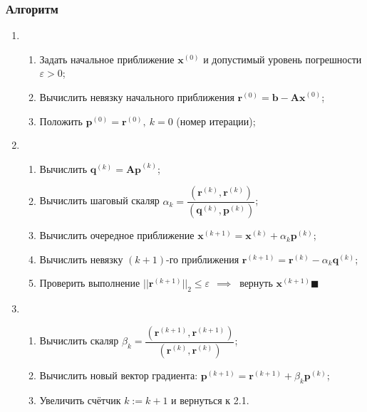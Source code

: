\subsubsection{Алгоритм}
\begin{enumerate}
    \item \begin{enumerate}
        \item Задать начальное приближение $\mathbf{x}^{(0)}$ и допустимый уровень погрешности $\varepsilon>0$;
        \item Вычислить невязку начального приближения $\mathbf{r}^{(0)}=\mathbf{b-Ax}^{(0)}$;
        \item Положить $\mathbf{p}^{(0)}=\mathbf{r}^{(0)},~k=0$ (номер итерации);
    \end{enumerate}
    \item \begin{enumerate}
        \item Вычислить $\mathbf{q}^{(k)}=\mathbf{Ap}^{(k)}$;
        \item Вычислить шаговый скаляр $\alpha_k=\dfrac{(\mathbf{r}^{(k)}, \mathbf{r}^{(k)})}{(\mathbf{q}^{(k)}, \mathbf{p}^{(k)})}$;
        \item Вычислить очередное приближение $\mathbf{x}^{(k+1)}=\mathbf{x}^{(k)}+\alpha_k\mathbf{p}^{(k)}$;
        \item Вычислить невязку $(k+1)$-го приближения $\mathbf{r}^{(k+1)}=\mathbf{r}^{(k)}-\alpha_k\mathbf{q}^{(k)}$;
        \item Проверить выполнение $||\mathbf{r}^{(k+1)}||_2 \le \varepsilon ~~\implies ~$ вернуть $\mathbf{x}^{(k+1)} \blacksquare$
    \end{enumerate}

    \item
    \begin{enumerate}
        \item Вычислить скаляр $\beta_k=\dfrac{(\mathbf{r}^{(k+1)}, \mathbf{r}^{(k+1)})}{(\mathbf{r}^{(k)}, \mathbf{r}^{(k)})}$;
        \item Вычислить новый вектор градиента: $\mathbf{p}^{(k+1)}=\mathbf{r}^{(k+1)}+\beta_k\mathbf{p}^{(k)}$;
        \item Увеличить счётчик $k:=k+1$ и вернуться к 2.1.
    \end{enumerate}
\end{enumerate}

